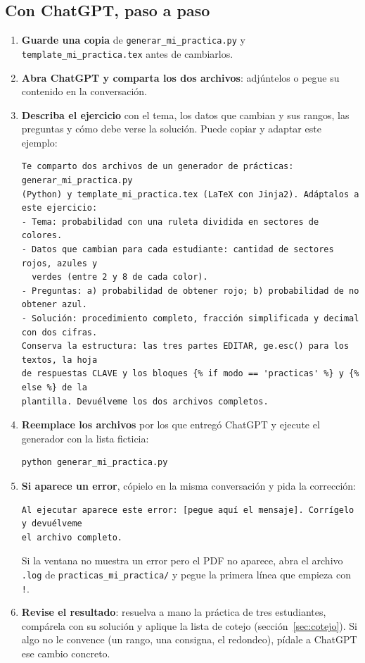 \documentclass[11pt]{article}
\newcommand{\cod}[1]{\texttt{#1}}
\begin{document}
\subsection{Con ChatGPT, paso a paso}\label{sec:chatgpt}

\begin{enumerate}[leftmargin=*]
\item \textbf{Guarde una copia} de \cod{generar\_mi\_practica.py} y \cod{template\_mi\_practica.tex} antes de cambiarlos.
\item \textbf{Abra ChatGPT y comparta los dos archivos}: adjúntelos o pegue su contenido en la conversación.
\item \textbf{Describa el ejercicio} con el tema, los datos que cambian y sus rangos, las preguntas y cómo debe verse la solución. Puede copiar y adaptar este ejemplo:
\begin{lstlisting}
Te comparto dos archivos de un generador de prácticas: generar_mi_practica.py
(Python) y template_mi_practica.tex (LaTeX con Jinja2). Adáptalos a este ejercicio:
- Tema: probabilidad con una ruleta dividida en sectores de colores.
- Datos que cambian para cada estudiante: cantidad de sectores rojos, azules y
  verdes (entre 2 y 8 de cada color).
- Preguntas: a) probabilidad de obtener rojo; b) probabilidad de no obtener azul.
- Solución: procedimiento completo, fracción simplificada y decimal con dos cifras.
Conserva la estructura: las tres partes EDITAR, ge.esc() para los textos, la hoja
de respuestas CLAVE y los bloques {% if modo == 'practicas' %} y {% else %} de la
plantilla. Devuélveme los dos archivos completos.
\end{lstlisting}
\item \textbf{Reemplace los archivos} por los que entregó ChatGPT y ejecute el generador con la lista ficticia:
\begin{lstlisting}
python generar_mi_practica.py
\end{lstlisting}
\item \textbf{Si aparece un error}, cópielo en la misma conversación y pida la corrección:
\begin{lstlisting}
Al ejecutar aparece este error: [pegue aquí el mensaje]. Corrígelo y devuélveme
el archivo completo.
\end{lstlisting}
Si la ventana no muestra un error pero el PDF no aparece, abra el archivo \cod{.log} de \cod{practicas\_mi\_practica/} y pegue la primera línea que empieza con \cod{!}.
\item \textbf{Revise el resultado}: resuelva a mano la práctica de tres estudiantes, compárela con su solución y aplique la lista de cotejo (sección~\ref{sec:cotejo}). Si algo no le convence (un rango, una consigna, el redondeo), pídale a ChatGPT ese cambio concreto.
\end{enumerate}
\end{document}
